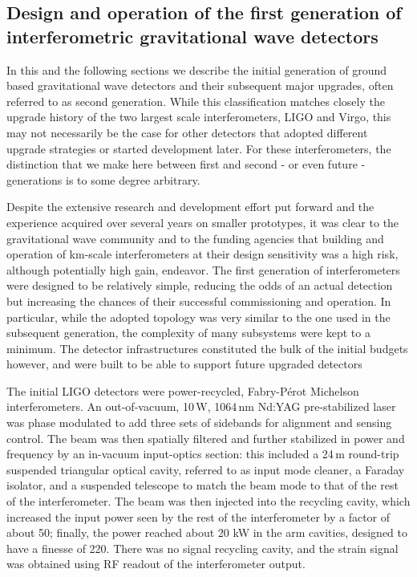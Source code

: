 \subsection{Design and operation of the first generation of interferometric gravitational wave detectors}\label{subsec:1stgen}
In this and the following sections we describe the initial generation of ground based gravitational wave detectors and their subsequent major upgrades, often referred to as second generation. While this classification matches closely the upgrade history of the two largest scale interferometers, LIGO and Virgo, this may not necessarily be the case for other detectors that adopted different upgrade strategies or started development later. For these interferometers, the distinction that we make here between first and second - or even future - generations is to some degree arbitrary.


Despite the extensive research and development effort put forward and the experience acquired over several years on smaller prototypes, it was clear to the gravitational wave community and to the funding agencies that building and operation of km-scale interferometers at their design sensitivity was a high risk, although potentially high gain, endeavor.
The first generation of interferometers were designed to be relatively simple, reducing the odds of an actual detection but increasing the chances of their successful commissioning and operation.
In particular, while the adopted topology was very similar to the one used in the subsequent generation, the complexity of many subsystems were kept to a minimum.
The detector infrastructures constituted the bulk of the initial budgets however, and were built to be able to support future upgraded detectors

The initial LIGO detectors\cite{Abbott_2004,Abbott_2009} were power-recycled, Fabry-P\'{e}rot Michelson interferometers.
An out-of-vacuum, 10\,W, 1064\,nm Nd:YAG pre-stabilized laser was phase modulated to add three sets of sidebands for alignment and sensing control.
The beam was then spatially filtered and further stabilized in power and frequency by an in-vacuum input-optics section: this included a 24\,m round-trip suspended triangular optical cavity, referred to as input mode cleaner, a Faraday isolator, and a suspended telescope to match the beam mode to that of the rest of the interferometer.
The beam was then injected into the recycling cavity,
which increased the input power seen by the rest of the interferometer by a factor of about 50; finally, the power reached about 20 kW in the arm cavities, designed to have a finesse of 220. There was no signal recycling cavity, and the strain signal was obtained using RF readout of the interferometer output.

